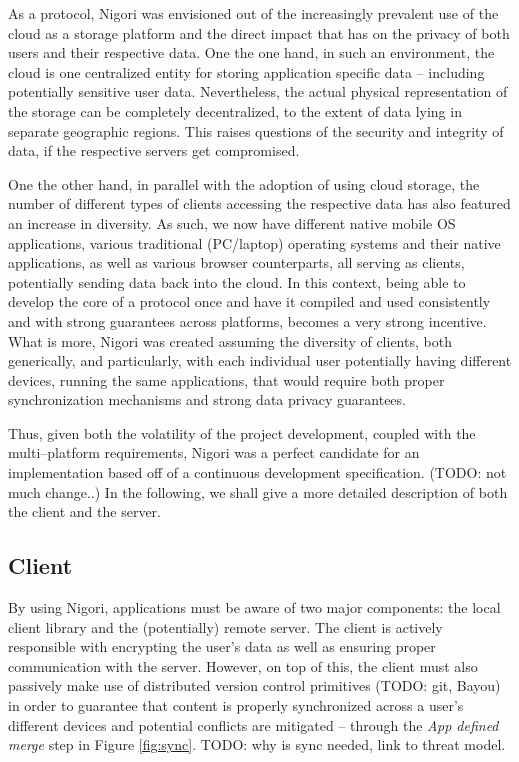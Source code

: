As a protocol, Nigori was envisioned out of the increasingly prevalent use of the cloud as a storage platform and the direct impact that has on the privacy of both users and their respective data.
One the one hand, in such an environment, the cloud is one centralized entity for storing application specific data -- including potentially sensitive user data.
Nevertheless, the actual physical representation of the storage can be completely decentralized, to the extent of data lying in separate geographic regions.
This raises questions of the security and integrity of data, if the respective servers get compromised.

One the other hand, in parallel with the adoption of using cloud storage, the number of different types of clients accessing the respective data has also featured an increase in diversity.
As such, we now have different native mobile OS applications, various traditional (PC/laptop) operating systems and their native applications, as well as various browser counterparts, all serving as clients, potentially sending data back into the cloud.
In this context, being able to develop the core of a protocol once and have it compiled and used consistently and with strong guarantees across platforms, becomes a very strong incentive.
What is more, Nigori was created assuming the diversity of clients, both generically, and particularly, with each individual user potentially having different devices, running the same applications, that would require both proper synchronization mechanisms and strong data privacy guarantees.

Thus, given both the volatility of the project development, coupled with the multi--platform requirements, Nigori was a perfect candidate for an implementation based off of a continuous development specification. (TODO: not much change..)
In the following, we shall give a more detailed description of both the client and the server.

\subsection{Client}
By using Nigori, applications must be aware of two major components: the local client library and the (potentially) remote server.
The client is actively responsible with encrypting the user's data as well as ensuring proper communication with the server.
However, on top of this, the client must also passively make use of distributed version control primitives (TODO: git, Bayou) in order to guarantee that content is properly synchronized across a user's different devices and potential conflicts are mitigated -- through the \textit{App defined merge} step in Figure \ref{fig:sync}. TODO: why is sync needed, link to threat model.

